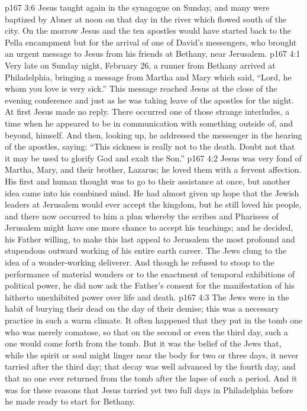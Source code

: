 \pc \vs p167 3:6 Jesus taught again in the synagogue on Sunday, and many were baptized by Abner at noon on that day in the river which flowed south of the city. On the morrow Jesus and the ten apostles would have started back to the Pella encampment but for the arrival of one of David’s messengers, who brought an urgent message to Jesus from his friends at Bethany, near Jerusalem.
\vs p167 4:1 Very late on Sunday night, February 26, a runner from Bethany arrived at Philadelphia, bringing a message from Martha and Mary which said, “Lord, he whom you love is very sick.” This message reached Jesus at the close of the evening conference and just as he was taking leave of the apostles for the night. At first Jesus made no reply. There occurred one of those strange interludes, a time when he appeared to be in communication with something outside of, and beyond, himself. And then, looking up, he addressed the messenger in the hearing of the apostles, saying: \textcolor{ubdarkred}{“This sickness is really not to the death. Doubt not that it may be used to glorify God and exalt the Son.”}
\pc \vs p167 4:2 Jesus was very fond of Martha, Mary, and their brother, Lazarus; he loved them with a fervent affection. His first and human thought was to go to their assistance at once, but another idea came into his combined mind. He had almost given up hope that the Jewish leaders at Jerusalem would ever accept the kingdom, but he still loved his people, and there now occurred to him a plan whereby the scribes and Pharisees of Jerusalem might have one more chance to accept his teachings; and he decided, his Father willing, to make this last appeal to Jerusalem the most profound and stupendous outward working of his entire earth career. The Jews clung to the idea of a wonder\hyp{}working deliverer. And though he refused to stoop to the performance of material wonders or to the enactment of temporal exhibitions of political power, he did now ask the Father’s consent for the manifestation of his hitherto unexhibited power over life and death.
\pc \vs p167 4:3 The Jews were in the habit of burying their dead on the day of their demise; this was a necessary practice in such a warm climate. It often happened that they put in the tomb one who was merely comatose, so that on the second or even the third day, such a one would come forth from the tomb. But it was the belief of the Jews that, while the spirit or soul might linger near the body for two or three days, it never tarried after the third day; that decay was well advanced by the fourth day, and that no one ever returned from the tomb after the lapse of such a period. And it was for these reasons that Jesus tarried yet two full days in Philadelphia before he made ready to start for Bethany.
